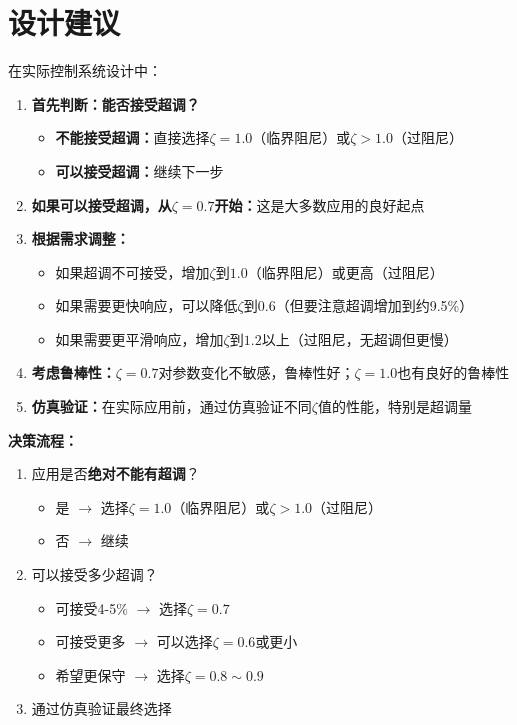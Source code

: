 \documentclass[12pt,a4paper]{article}
\begin{document}
\section{设计建议}

在实际控制系统设计中：

\begin{enumerate}
\item \textbf{首先判断：能否接受超调？}
   \begin{itemize}
   \item \textbf{不能接受超调：}直接选择$\zeta = 1.0$（临界阻尼）或$\zeta > 1.0$（过阻尼）
   \item \textbf{可以接受超调：}继续下一步
   \end{itemize}

\item \textbf{如果可以接受超调，从$\zeta = 0.7$开始：}这是大多数应用的良好起点
\item \textbf{根据需求调整：}
   \begin{itemize}
   \item 如果超调不可接受，增加$\zeta$到$1.0$（临界阻尼）或更高（过阻尼）
   \item 如果需要更快响应，可以降低$\zeta$到$0.6$（但要注意超调增加到约9.5\%）
   \item 如果需要更平滑响应，增加$\zeta$到$1.2$以上（过阻尼，无超调但更慢）
   \end{itemize}
\item \textbf{考虑鲁棒性：}$\zeta = 0.7$对参数变化不敏感，鲁棒性好；$\zeta = 1.0$也有良好的鲁棒性
\item \textbf{仿真验证：}在实际应用前，通过仿真验证不同$\zeta$值的性能，特别是超调量
\end{enumerate}

\textbf{决策流程：}
\begin{enumerate}
\item 应用是否\textbf{绝对不能有超调}？
   \begin{itemize}
   \item 是 $\rightarrow$ 选择$\zeta = 1.0$（临界阻尼）或$\zeta > 1.0$（过阻尼）
   \item 否 $\rightarrow$ 继续
   \end{itemize}
\item 可以接受多少超调？
   \begin{itemize}
   \item 可接受4-5\% $\rightarrow$ 选择$\zeta = 0.7$
   \item 可接受更多 $\rightarrow$ 可以选择$\zeta = 0.6$或更小
   \item 希望更保守 $\rightarrow$ 选择$\zeta = 0.8 \sim 0.9$
   \end{itemize}
\item 通过仿真验证最终选择
\end{enumerate}
\end{document}
